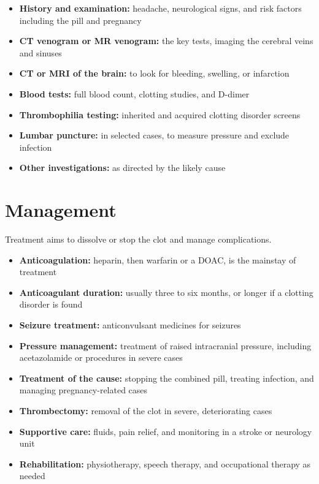 \begin{itemize}
    \item \textbf{History and examination:} headache, neurological signs, and risk factors including the pill and pregnancy
    \item \textbf{CT venogram or MR venogram:} the key tests, imaging the cerebral veins and sinuses
    \item \textbf{CT or MRI of the brain:} to look for bleeding, swelling, or infarction
    \item \textbf{Blood tests:} full blood count, clotting studies, and D-dimer
    \item \textbf{Thrombophilia testing:} inherited and acquired clotting disorder screens
    \item \textbf{Lumbar puncture:} in selected cases, to measure pressure and exclude infection
    \item \textbf{Other investigations:} as directed by the likely cause
\end{itemize}

\section*{Management}
Treatment aims to dissolve or stop the clot and manage complications.

\begin{itemize}
    \item \textbf{Anticoagulation:} heparin, then warfarin or a DOAC, is the mainstay of treatment
    \item \textbf{Anticoagulant duration:} usually three to six months, or longer if a clotting disorder is found
    \item \textbf{Seizure treatment:} anticonvulsant medicines for seizures
    \item \textbf{Pressure management:} treatment of raised intracranial pressure, including acetazolamide or procedures in severe cases
    \item \textbf{Treatment of the cause:} stopping the combined pill, treating infection, and managing pregnancy-related cases
    \item \textbf{Thrombectomy:} removal of the clot in severe, deteriorating cases
    \item \textbf{Supportive care:} fluids, pain relief, and monitoring in a stroke or neurology unit
    \item \textbf{Rehabilitation:} physiotherapy, speech therapy, and occupational therapy as needed
\end{itemize}

